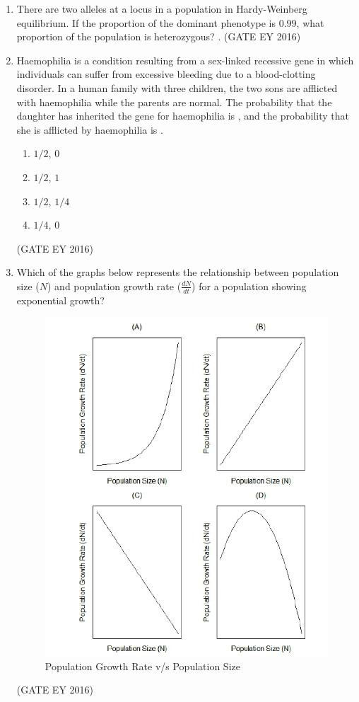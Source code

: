 \documentclass[journal]{IEEEtran}
\begin{document}
\begin{enumerate}[label=Q.\arabic*.]
\item There are two alleles at a locus in a population in Hardy-Weinberg equilibrium. If the proportion of the dominant phenotype is $0.99$, what proportion of the population is heterozygous? \underline{\hspace{3cm}}.
\hfill{(GATE EY 2016)}

\item Haemophilia is a condition resulting from a sex-linked recessive gene in which individuals can suffer from excessive bleeding due to a blood-clotting disorder. In a human family with three children, the two sons are afflicted with haemophilia while the parents are normal. The probability that the daughter has inherited the gene for haemophilia is \underline{\hspace{1cm}}, and the probability that she is afflicted by haemophilia is \underline{\hspace{1cm}}.
\begin{multicols}{2}
\begin{enumerate}
    \item $1/2$, $0$
    \item $1/2$, $1$
    \item $1/2$, $1/4$
    \item $1/4$, $0$
\end{enumerate}
\end{multicols}
\hfill{(GATE EY 2016)}

\item Which of the graphs below represents the relationship between population size ($N$) and population growth rate ($\frac{dN}{dt}$) for a population showing exponential growth? 
\begin{figure}[h]
    \centering
    \includegraphics[width=0.1\columnwidth]{figs/Q-41.png}
    \caption{Population Growth Rate v/s Population Size}
    \label{Fig.5}
\end{figure}

\hfill{(GATE EY 2016)}


\end{enumerate}
\end{document}
